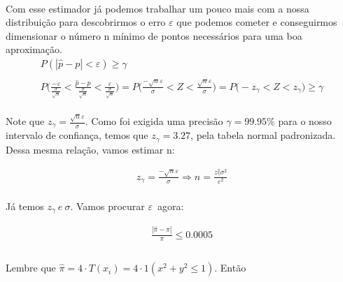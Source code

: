 \documentclass{article}
\begin{document}
    \paragraph{} Com esse estimador já podemos trabalhar um pouco mais com a nossa distribuição para descobrirmos o erro $\varepsilon$ que podemos cometer e conseguirmos dimensionar o número n mínimo de pontos necessários para uma boa aproximação.
    \begin{gather*}
        P(|\widehat{p} - p| < \varepsilon) \ge \gamma \\ \\
        P \biggl( \frac{-\varepsilon}{\frac{\sigma}{\sqrt{n}}} < \frac{\widehat{p} - p}{\frac{\sigma}{\sqrt{n}}} < \frac{\varepsilon}{\frac{\sigma}{\sqrt{n}}} \biggl) =
        P \biggl( \frac{-\sqrt{n}\varepsilon}{\sigma} < Z < \frac{\sqrt{n}\varepsilon}{\sigma} \biggl) = P \biggl( -z_\gamma < Z < z_\gamma \biggl)\ge \gamma
    \end{gather*}

    \paragraph{} Note que $z_\gamma = \frac{\sqrt{n}\varepsilon}{\sigma}$. Como foi exigida uma precisão $\gamma = 99.95\%$ para o nosso intervalo de confiança, temos que $z_\gamma = 3.27$, pela tabela normal padronizada. Dessa mesma relação, vamos estimar n:

    \begin{gather*}
        z_\gamma = \frac{-\sqrt{n}\varepsilon}{\sigma} \Longrightarrow n = \frac{z_\gamma^2 \sigma^2}{\varepsilon^2}
    \end{gather*}

    \paragraph{} Já temos $z_\gamma\ e\ \sigma$. Vamos procurar $\varepsilon$\ agora:
    
    \begin{gather*}
        \frac{|\widehat{\pi}-\pi|}{\pi} \le 0.0005 \\
    \end{gather*}

    \paragraph{} Lembre que $\widehat{\pi} = 4\cdot T(x_i) = 4\cdot 1(x^2+y^2\le 1)$. Então
    
\end{document}
